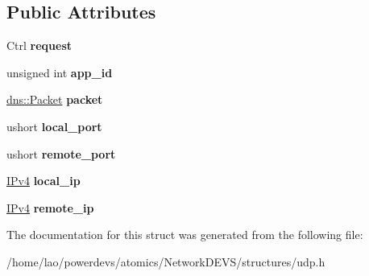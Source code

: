\subsection*{Public Attributes}
\begin{DoxyCompactItemize}
\item 
Ctrl {\bfseries request}\hypertarget{structudp_1_1Control_a2aa019b350db9c5f2d66f20772d9b79b}{}\label{structudp_1_1Control_a2aa019b350db9c5f2d66f20772d9b79b}

\item 
unsigned int {\bfseries app\+\_\+id}\hypertarget{structudp_1_1Control_af8d12ad139541466d82bd99d79e3be42}{}\label{structudp_1_1Control_af8d12ad139541466d82bd99d79e3be42}

\item 
\hyperlink{structdns_1_1Packet}{dns\+::\+Packet} {\bfseries packet}\hypertarget{structudp_1_1Control_afb69653a07aa874b2c6be07621744c9d}{}\label{structudp_1_1Control_afb69653a07aa874b2c6be07621744c9d}

\item 
ushort {\bfseries local\+\_\+port}\hypertarget{structudp_1_1Control_a4f07eed648f80d37385c12a0b5b803f8}{}\label{structudp_1_1Control_a4f07eed648f80d37385c12a0b5b803f8}

\item 
ushort {\bfseries remote\+\_\+port}\hypertarget{structudp_1_1Control_a03d29c28ed03e44e4db2df155f638b3e}{}\label{structudp_1_1Control_a03d29c28ed03e44e4db2df155f638b3e}

\item 
\hyperlink{structIPv4}{I\+Pv4} {\bfseries local\+\_\+ip}\hypertarget{structudp_1_1Control_a3f31765e13cd17a0c2661754971db196}{}\label{structudp_1_1Control_a3f31765e13cd17a0c2661754971db196}

\item 
\hyperlink{structIPv4}{I\+Pv4} {\bfseries remote\+\_\+ip}\hypertarget{structudp_1_1Control_ae07465d93c71c8ed4a74d8c523c6f054}{}\label{structudp_1_1Control_ae07465d93c71c8ed4a74d8c523c6f054}

\end{DoxyCompactItemize}


The documentation for this struct was generated from the following file\+:\begin{DoxyCompactItemize}
\item 
/home/lao/powerdevs/atomics/\+Network\+D\+E\+V\+S/structures/udp.\+h\end{DoxyCompactItemize}
